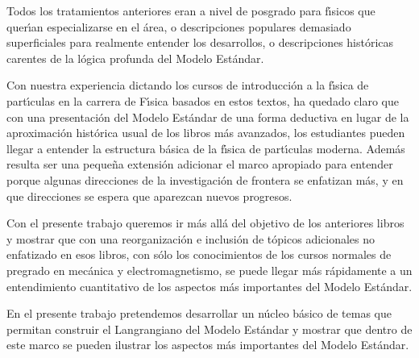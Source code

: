 Todos los tratamientos anteriores eran a nivel de posgrado  para f\'\i sicos que quer\'\i an especializarse en el \'area, o descripciones populares demasiado superficiales para realmente entender los desarrollos, o descripciones hist\'oricas carentes de la l\'ogica profunda del Modelo Est\'andar. 

Con nuestra experiencia dictando los cursos de introducci\'on a la f\'\i sica de part\'\i culas en la carrera de F\'\i sica basados en estos textos, ha quedado claro que con una presentaci\'on del Modelo Est\'andar de una forma deductiva en lugar de la aproximaci\'on hist\'orica usual de los libros m\'as avanzados, los estudiantes pueden llegar a entender la estructura b\'asica de la f\'\i sica de part\'\i culas moderna. Adem\'as resulta ser una peque\~na extensi\'on adicionar el marco apropiado para entender porque algunas direcciones de la investigaci\'on de frontera se enfatizan m\'as, y en que direcciones se espera que aparezcan nuevos progresos.

Con el presente trabajo queremos ir m\'as all\'a del objetivo de los anteriores libros y mostrar que con una reorganizaci\'on e inclusi\'on de t\'opicos adicionales no enfatizado en esos libros, con s\'olo los conocimientos de los cursos normales de pregrado en mec\'anica y electromagnetismo, se puede llegar m\'as r\'apidamente a un entendimiento cuantitativo de los aspectos m\'as importantes del Modelo Est\'andar.  

En el presente trabajo pretendemos desarrollar un n\'ucleo b\'asico de temas que permitan construir el Langrangiano del Modelo Est\'andar y mostrar que dentro de este marco se pueden ilustrar los aspectos m\'as importantes del Modelo Est\'andar.


